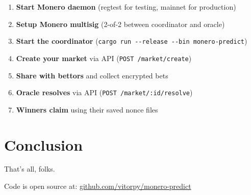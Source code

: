 \documentclass{article}
\begin{document}
\begin{enumerate}
\item \textbf{Start Monero daemon} (regtest for testing, mainnet for production)

\item \textbf{Setup Monero multisig} (2-of-2 between coordinator and oracle)

\item \textbf{Start the coordinator} (\texttt{cargo run -{}-release -{}-bin monero-predict})

\item \textbf{Create your market} via API (\texttt{POST /market/create})

\item \textbf{Share with bettors} and collect encrypted bets

\item \textbf{Oracle resolves} via API (\texttt{POST /market/:id/resolve})

\item \textbf{Winners claim} using their saved nonce files

\end{enumerate}

\section{Conclusion}

That's all, folks.

Code is open source at: \href{https://github.com/vitorpy/monero-predict}{github.com/vitorpy/monero-predict}


\end{document}
